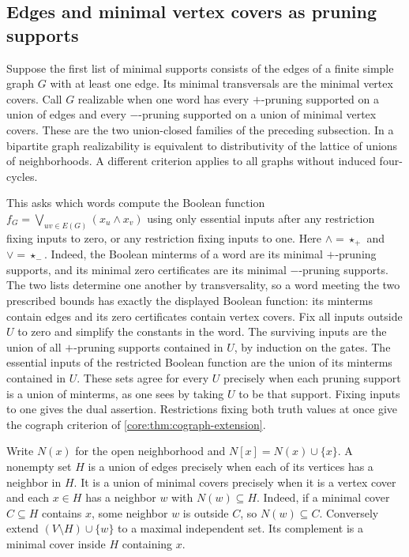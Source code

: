 \subsection{Edges and minimal vertex covers as pruning supports}
\label{app:core-graph-prunings}

Suppose the first list of minimal supports consists of the edges of a
finite simple graph $G$ with at least one edge. Its minimal transversals
are the minimal vertex covers. Call $G$ realizable when one word has
every $+$-pruning supported on a union of edges and every $-$-pruning
supported on a union of minimal vertex covers. These are the two
union-closed families of the preceding subsection. In a bipartite graph
realizability is equivalent to distributivity of the lattice of unions
of neighborhoods. A different criterion applies to all graphs without
induced four-cycles.

This asks which words compute the Boolean function
$f_G=\bigvee_{uv\in E(G)}(x_u\land x_v)$ using only essential
inputs after any restriction fixing inputs to zero, or any restriction
fixing inputs to one. Here $\land=\star_+$ and $\lor=\star_-$.
Indeed, the Boolean minterms of a word are its minimal $+$-pruning
supports, and its minimal zero certificates are its minimal $-$-pruning
supports. The two lists determine one another by transversality, so a
word meeting the two prescribed bounds has exactly the displayed Boolean
function: its minterms contain edges and its zero certificates contain
vertex covers. Fix all inputs outside $U$ to zero and simplify the
constants in the word. The surviving inputs are the union of all
$+$-pruning supports contained in $U$, by induction on the gates.
The essential inputs of the restricted Boolean function are the union
of its minterms contained in $U$. These sets agree for every $U$
precisely when each pruning support is a union of minterms, as one
sees by taking $U$ to be that support. Fixing inputs to one gives the
dual assertion. Restrictions fixing both truth values at once give
the cograph criterion of \cref{core:thm:cograph-extension}.

Write $N(x)$ for the open neighborhood and $N[x]=N(x)\cup\{x\}$.
A nonempty set $H$ is a union of edges precisely when each of its
vertices has a neighbor in $H$. It is a union of minimal covers
precisely when it is a vertex cover and each $x\in H$ has a neighbor
$w$ with $N(w)\subseteq H$. Indeed, if a minimal cover $C\subseteq H$
contains $x$, some neighbor $w$ is outside $C$, so $N(w)\subseteq C$.
Conversely extend $(V\setminus H)\cup\{w\}$ to a maximal independent
set. Its complement is a minimal cover inside $H$ containing $x$.

